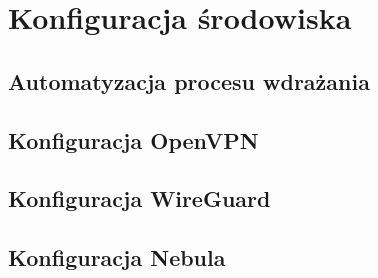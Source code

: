 \section{Konfiguracja środowiska}
\subsection{Automatyzacja procesu wdrażania}
\subsection{Konfiguracja OpenVPN}
\subsection{Konfiguracja WireGuard}
\subsection{Konfiguracja Nebula}